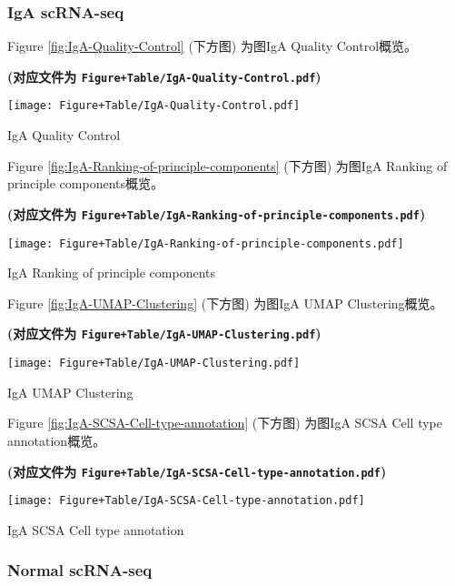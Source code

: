 \documentclass[
]{article}
\begin{document}
\hypertarget{iga-scrna-seq}{%
\subsubsection{IgA scRNA-seq}\label{iga-scrna-seq}}

Figure \ref{fig:IgA-Quality-Control} (下方图) 为图IgA Quality Control概览。

\textbf{(对应文件为 \texttt{Figure+Table/IgA-Quality-Control.pdf})}

\def\@captype{figure}
\begin{center}
\texttt{[image: Figure+Table/IgA-Quality-Control.pdf]}
\caption{IgA Quality Control}\label{fig:IgA-Quality-Control}
\end{center}

Figure \ref{fig:IgA-Ranking-of-principle-components} (下方图) 为图IgA Ranking of principle components概览。

\textbf{(对应文件为 \texttt{Figure+Table/IgA-Ranking-of-principle-components.pdf})}

\def\@captype{figure}
\begin{center}
\texttt{[image: Figure+Table/IgA-Ranking-of-principle-components.pdf]}
\caption{IgA Ranking of principle components}\label{fig:IgA-Ranking-of-principle-components}
\end{center}

Figure \ref{fig:IgA-UMAP-Clustering} (下方图) 为图IgA UMAP Clustering概览。

\textbf{(对应文件为 \texttt{Figure+Table/IgA-UMAP-Clustering.pdf})}

\def\@captype{figure}
\begin{center}
\texttt{[image: Figure+Table/IgA-UMAP-Clustering.pdf]}
\caption{IgA UMAP Clustering}\label{fig:IgA-UMAP-Clustering}
\end{center}

Figure \ref{fig:IgA-SCSA-Cell-type-annotation} (下方图) 为图IgA SCSA Cell type annotation概览。

\textbf{(对应文件为 \texttt{Figure+Table/IgA-SCSA-Cell-type-annotation.pdf})}

\def\@captype{figure}
\begin{center}
\texttt{[image: Figure+Table/IgA-SCSA-Cell-type-annotation.pdf]}
\caption{IgA SCSA Cell type annotation}\label{fig:IgA-SCSA-Cell-type-annotation}
\end{center}

\hypertarget{normal-scrna-seq}{%
\subsubsection{Normal scRNA-seq}\label{normal-scrna-seq}}
\end{document}
